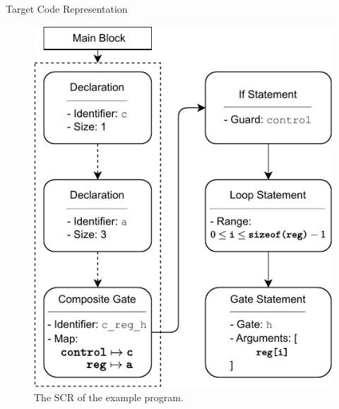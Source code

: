 \begin{frame}{Target Code Representation}
\begin{minipage}{.32\textwidth}
\begin{figure}[htp]
            \includegraphics[width=\textwidth]{../figures/drawio/codeGen_sourceCode_example.pdf}
            \caption{The SCR of the example program.}
        \end{figure}
    \end{minipage}
    \hfill
    \begin{minipage}{.28\textwidth}
        \centering
        \begin{figure}[htp]
            \centering

\end{figure}
\end{minipage}
\end{frame}
